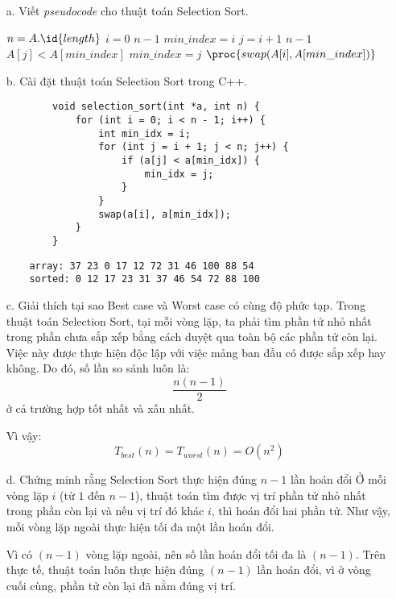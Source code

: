 \documentclass[12pt,a4paper]{article}
\begin{document}
\begin{enumerate}
    \item[a.] Viết \textit{pseudocode} cho thuật toán Selection Sort.
    \begin{codebox}
            \li $n = A.\id{length}$
            \li \For $i = 0$ \To $n - 1$
                \Do
                    \li $min\_index = i$
                    \li \For $j = i + 1$ \To $n - 1$
                        \Do
                            \li \If $A[j] < A[min\_index]$
                            \Then
                                \li $min\_index = j$
                            \End
                        \End
                    \li $\proc{swap(A[i], A[min\_index])}$
                \End
    \end{codebox}

    \item[b.] Cài đặt thuật toán Selection Sort trong C++.
    \begin{verbatim}
        void selection_sort(int *a, int n) {
            for (int i = 0; i < n - 1; i++) {
                int min_idx = i;
                for (int j = i + 1; j < n; j++) {
                    if (a[j] < a[min_idx]) {
                        min_idx = j; 
                    }
                }
                swap(a[i], a[min_idx]);
            }
        }
    \end{verbatim}

    \begin{verbatim}
    array: 37 23 0 17 12 72 31 46 100 88 54
    sorted: 0 12 17 23 31 37 46 54 72 88 100
    \end{verbatim}

    \item[c.] Giải thích tại sao Best case và Worst case có cùng độ phức tạp.
    \newline
    Trong thuật toán Selection Sort, tại mỗi vòng lặp, ta phải tìm phần tử nhỏ nhất 
    trong phần chưa sắp xếp bằng cách duyệt qua toàn bộ các phần tử còn lại.
    Việc này được thực hiện độc lập với việc mảng ban đầu có được sắp xếp hay không.
    Do đó, số lần so sánh luôn là:
    \[
        \frac{n(n-1)}{2}
    \]
    ở cả trường hợp tốt nhất và xấu nhất.

    Vì vậy:
    \[
        T_{best}(n) = T_{worst}(n) = O(n^2)
    \]

    \item[d.] Chứng minh rằng Selection Sort thực hiện đúng $n-1$ lần hoán đổi
    \newline
    Ở mỗi vòng lặp $i$ (từ $1$ đến $n-1$), thuật toán tìm được vị trí phần tử 
    nhỏ nhất trong phần còn lại và nếu vị trí đó khác $i$, thì hoán đổi hai phần tử.
    Như vậy, mỗi vòng lặp ngoài thực hiện tối đa một lần hoán đổi.

    Vì có $(n-1)$ vòng lặp ngoài, nên số lần hoán đổi tối đa là $(n-1)$.
    Trên thực tế, thuật toán luôn thực hiện đúng $(n-1)$ lần hoán đổi, vì ở vòng cuối cùng, 
    phần tử còn lại đã nằm đúng vị trí.
\end{enumerate}
\end{document}
